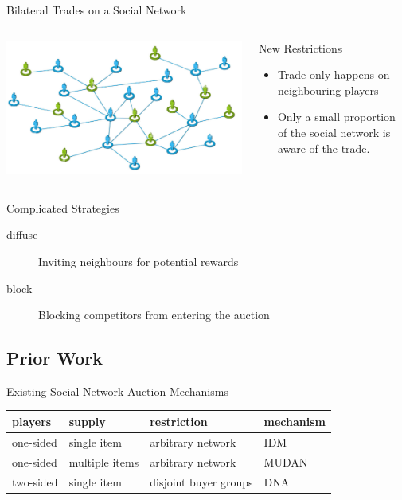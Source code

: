 \documentclass{beamer}
\begin{document}
\begin{frame}{Bilateral Trades on a Social Network}
	\begin{columns}
		\begin{column}{0.4\textwidth}
			\includegraphics[height=0.3\textheight]{exchange-trade-social-network}
		\end{column}
		\begin{column}{0.5\textwidth}
			\begin{block}{New Restrictions}
				\begin{itemize}
					\item Trade only happens on neighbouring players
					\item Only a small proportion of the social network is aware of the trade.
				\end{itemize}
			\end{block}
		\end{column}
	\end{columns}

	\begin{alertblock}{Complicated Strategies}
		\begin{description}
			\item[diffuse] Inviting neighbours for potential rewards
			\item[block] Blocking competitors from entering the auction
		\end{description}
	\end{alertblock}
\end{frame}

\subsection{Prior Work}
\begin{frame}{Existing Social Network Auction Mechanisms}
	\begin{center}
		\begin{tabular}{ll|l|l}
			players   & supply         & restriction           & mechanism \\
			\hline
			one-sided & single item    & arbitrary network     & IDM       \\
			one-sided & multiple items & arbitrary network     & MUDAN     \\
			two-sided & single item    & disjoint buyer groups & DNA       \\
		\end{tabular}
	\end{center}
\end{frame}
\end{document}
